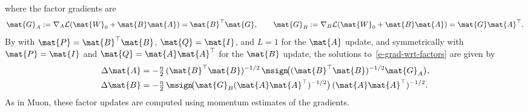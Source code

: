 where the factor gradients are
\begin{equation}\label{e-grad-wrt-factors}
    \mat{G}_A := \nabla_A \mathcal{L}(\mat{W}_0+\mat{B}\mat{A}) = \mat{B}^\top \mat{G},
    \qquad
    \mat{G}_B := \nabla_B \mathcal{L}(\mat{W}_0+\mat{B}\mat{A}) = \mat{G} \mat{A}^\top.
\end{equation}
By  with $\mat{P}=\mat{B}^\top \mat{B}$, $\mat{Q}=\mat{I}$, and $L=1$ for the $\mat{A}$ update, and symmetrically with $\mat{P}=\mat{I}$ and $\mat{Q}=\mat{A}\mat{A}^\top$ for the $\mat{B}$ update, the solutions to~\eqref{e-grad-wrt-factors} are given by
\begin{equation}\label{eq:product-muon-step}
\begin{aligned}
    \Delta\mat{A} &= -\tfrac{\eta}{2}\,(\mat{B}^\top \mat{B})^{-1/2}\,\msign\!\big((\mat{B}^\top \mat{B})^{-1/2} \mat{G}_A\big), \\
    \Delta\mat{B} &= -\tfrac{\eta}{2}\,\msign\!\big(\mat{G}_B (\mat{A} \mat{A}^\top)^{-1/2}\big)\,(\mat{A} \mat{A}^\top)^{-1/2}.
\end{aligned}
\end{equation}
As in Muon, these factor updates are computed using momentum estimates of the gradients.


